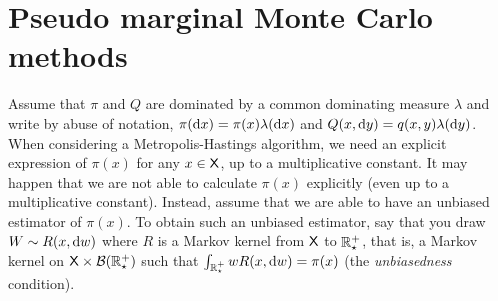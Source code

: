 \documentclass[english,graybox,envcountchap,envcountsame,sectrefs,shortlabels]{svmono}
\theoremstyle{style}
\begin{document}
\section{Pseudo marginal Monte Carlo methods}
Assume that $\pi$ and $Q$ are dominated by a common dominating measure $\lambda$ and write by abuse of notation, $\pi(\mathrm{d} x)=\pi(x)\lambda(\mathrm{d} x)$ and $Q(x,\mathrm{d} y)=q(x,y)\lambda(\mathrm{d} y)$. When considering a Metropolis-Hastings algorithm, we need an explicit expression of $\pi(x)$ for any $x\in\mathsf{X}$, up to a multiplicative constant. It may happen that we are not able to calculate $\pi(x)$ explicitly (even up to a multiplicative constant). Instead, assume that we are able to have an unbiased estimator of $\pi(x)$. To obtain such an unbiased estimator, say that you draw $W\sim R(x,\mathrm{d} w)$ where $R$ is a Markov kernel from $\mathsf{X}$ to $\mathbb{R}^+_\star$, that is, a Markov kernel on $\mathsf{X}\times {\mathcal B}(\mathbb{R}^+_\star)$ such that $\int_{\mathbb{R}^+_\star} w R(x,\mathrm{d} w)=\pi(x)$ (the {\em unbiasedness} condition).
\end{document}
